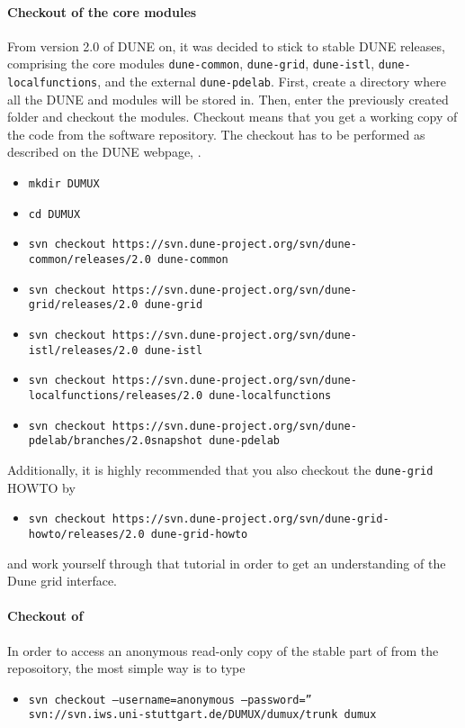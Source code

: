 \paragraph{Checkout of the core modules}
From version 2.0 of DUNE on, it was decided to stick to stable DUNE releases, comprising the core modules 
\texttt{dune-common}, \texttt{dune-grid}, \texttt{dune-istl}, \texttt{dune-localfunctions}, and the external \texttt{dune-pdelab}.  
First, create a directory where all the DUNE and \Dumux modules will be stored in. Then, enter the previously created folder and checkout the modules. Checkout means that you get a working copy of the code from the software repository. 
The checkout has to be performed as described on the DUNE webpage, \cite{DUNE-HP}.
\begin{itemize}
\item \texttt{mkdir DUMUX}
\item \texttt{cd DUMUX}
\item \texttt{svn checkout https://svn.dune-project.org/svn/dune-common/releases/2.0 dune-common}
\item \texttt{svn checkout https://svn.dune-project.org/svn/dune-grid/releases/2.0 dune-grid}
\item \texttt{svn checkout https://svn.dune-project.org/svn/dune-istl/releases/2.0 dune-istl}
\item \texttt{svn checkout https://svn.dune-project.org/svn/dune-localfunctions/releases/2.0 dune-localfunctions}
\item \texttt{svn checkout https://svn.dune-project.org/svn/dune-pdelab/branches/2.0snapshot dune-pdelab}
\end{itemize} 

Additionally, it is highly recommended that you also checkout the \texttt{dune-grid} HOWTO by 
\begin{itemize}
\item \texttt{svn checkout https://svn.dune-project.org/svn/dune-grid-howto/releases/2.0 dune-grid-howto}
\end{itemize}
and work yourself through that tutorial in order to get an understanding of the Dune grid interface. 

\paragraph{Checkout of \Dumux}

In order to access an anonymous read-only copy of the stable part of \Dumux from the reposoitory, the most simple way is to type
\begin{itemize}
\item \texttt{svn checkout --username=anonymous --password='' \\ 
svn://svn.iws.uni-stuttgart.de/DUMUX/dumux/trunk dumux}
\end{itemize}

